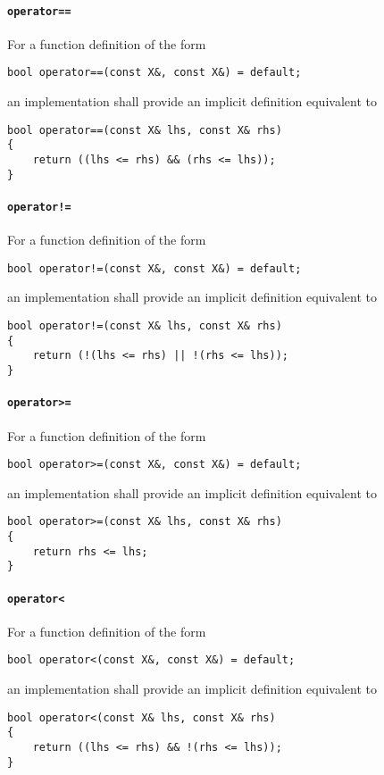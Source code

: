 ﻿\documentclass[a4paper,11pt,final]{article}
\numberwithin{equation}{subsection}
\begin{document}
\paragraph{\texttt{operator==}}
For a function definition of the form
\begin{verbatim}
bool operator==(const X&, const X&) = default;
\end{verbatim}
an implementation shall provide an implicit definition equivalent to
\begin{verbatim}
bool operator==(const X& lhs, const X& rhs)
{
    return ((lhs <= rhs) && (rhs <= lhs));
}
\end{verbatim}

\paragraph{\texttt{operator!=}}
For a function definition of the form
\begin{verbatim}
bool operator!=(const X&, const X&) = default;
\end{verbatim}
an implementation shall provide an implicit definition equivalent to
\begin{verbatim}
bool operator!=(const X& lhs, const X& rhs)
{
    return (!(lhs <= rhs) || !(rhs <= lhs));
}
\end{verbatim}

\paragraph{\texttt{operator>=}}
For a function definition of the form
\begin{verbatim}
bool operator>=(const X&, const X&) = default;
\end{verbatim}
an implementation shall provide an implicit definition equivalent to
\begin{verbatim}
bool operator>=(const X& lhs, const X& rhs)
{
    return rhs <= lhs;
}
\end{verbatim}

\paragraph{\texttt{operator<}}
For a function definition of the form
\begin{verbatim}
bool operator<(const X&, const X&) = default;
\end{verbatim}
an implementation shall provide an implicit definition equivalent to
\begin{verbatim}
bool operator<(const X& lhs, const X& rhs)
{
    return ((lhs <= rhs) && !(rhs <= lhs));
}
\end{verbatim}
\end{document}
